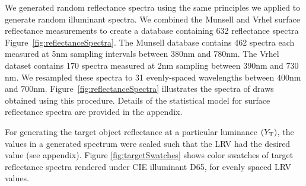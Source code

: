 \documentclass{jov}
\begin{document}
We generated random reflectance spectra using the same principles we applied to generate random illuminant spectra.
We combined the Munsell \cite{kelly1943tristimulus} and Vrhel \cite{vrhel1994measurement} surface reflectance 
measurements to create a database containing 632 reflectance spectra Figure~\ref{fig:reflectanceSpectra}.
The Munsell database contains 462 spectra each measured at 5nm sampling intervals between 380nm and 780nm.
The Vrhel dataset contains 170 spectra measured at 2nm sampling between 390nm and 730 nm.
We resampled these spectra to 31 evenly-spaced wavelengths between $400$nm and $700$nm.
Figure~\ref{fig:reflectanceSpectra} illustrates the spectra of draws obtained using this procedure.
Details of the statistical model for surface reflectance spectra are provided in the appendix. 

For generating the target object reflectance at a particular luminance $(Y_{\rm T})$, the values in a generated spectrum were 
scaled such that the LRV had the desired value (see appendix).
Figure \ref{fig:targetSwatches} shows color swatches of target reflectance spectra rendered under CIE illuminant D65, for evenly spaced LRV values.
\end{document}
